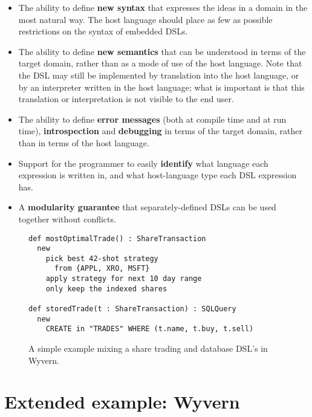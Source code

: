 \documentclass[preprint]{sigplanconf}
\begin{document}
\begin{itemize}

\item The ability to define \textbf{new syntax} that expresses the ideas
in a domain in the most natural way.  The host language should place as
few as possible restrictions on the syntax of embedded DSLs.


\item The ability to define \textbf{new semantics} that can be understood
in terms of the target domain, rather than as a mode of use of the host
language.  Note that the DSL may still be implemented by translation into
the host language, or by an interpreter written in the host language; what
is important is that this translation or interpretation is not visible to
the end user.

\item The ability to define \textbf{error messages} (both at compile time
and at run time), \textbf{introspection} and \textbf{debugging} in terms
of the target domain, rather than in terms of the host language.

\item Support for the programmer to easily \textbf{identify} what language
each expression is written in, and what host-language type each DSL
expression has.

\item A \textbf{modularity guarantee} that separately-defined DSLs can
be used together without conflicts.

\end{itemize} 


\begin{figure}[t]
\begin{lstlisting}
def mostOptimalTrade() : ShareTransaction
  new
    pick best 42-shot strategy
      from {APPL, XRO, MSFT}
    apply strategy for next 10 day range
    only keep the indexed shares

def storedTrade(t : ShareTransaction) : SQLQuery
  new
    CREATE in "TRADES" WHERE (t.name, t.buy, t.sell)
\end{lstlisting}
\caption{A simple example mixing a share trading and database DSL's in Wyvern.}
\label{f:dsl}
\end{figure}


\section{Extended example: Wyvern}
\end{document}
